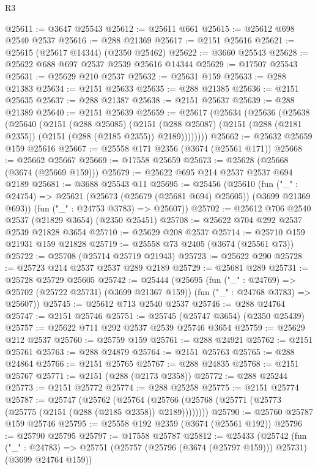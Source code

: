 \begin{lexlean}{R3}
\begin{coremodule}
@25611 := @3647 @25543
@25612 := @25611 @661
@25615 := @25612 @698 @2540 @2537
@25616 := @288 @21369
@25617 := @2151 @25616
@25621 := @25615 (@25617 @14344) (@2350 @25462)
@25622 := @3660 @25543
@25628 := @25622 @688 @697 @2537 @2539 @25616 @14344
@25629 := @17507 @25543
@25631 := @25629 @210 @2537
@25632 := @25631 @159
@25633 := @288 @21383
@25634 := @2151 @25633
@25635 := @288 @21385
@25636 := @2151 @25635
@25637 := @288 @21387
@25638 := @2151 @25637
@25639 := @288 @21389
@25640 := @2151 @25639
@25659 := @25617
    (@25634
      (@25636
        (@25638
          (@25640
            (@2151
              (@288 @25085)
              (@2151
                (@288 @25087)
                (@2151 (@288 (@2181 @2355)) (@2151 (@288 (@2185 @2355)) @2189))))))))
@25662 := @25632 @25659 @159 @25616
@25667 := @25558 @171 @2356 (@3674 (@25561 @171))
@25668 := @25662 @25667
@25669 := @17558 @25659
@25673 := @25628 (@25668 (@3674 (@25669 @159)))
@25679 := @25622 @695 @214 @2537 @2537 @694 @2189
@25681 := @3688 @25543 @11
@25695 := @25456
    (@25610
      (fun ("_" : @24754) => @25621 (@25673 (@25679 (@25681 @694) @25605)) (@3699 @21369 @693))
      (fun ("_" : @24753 @3783) => @25607))
@25702 := @25612 @706 @2540 @2537 (@21829 @3654) (@2350 @25451)
@25708 := @25622 @704 @292 @2537 @2539 @21828 @3654
@25710 := @25629 @208 @2537
@25714 := @25710 @159 @21931 @159 @21828
@25719 := @25558 @73 @2405 (@3674 (@25561 @73))
@25722 := @25708 (@25714 @25719 @21943)
@25723 := @25622 @290
@25728 := @25723 @214 @2537 @2537 @289 @2189
@25729 := @25681 @289
@25731 := @25728 @25729 @25605
@25742 := @25444
    (@25695
      (fun ("_" : @24769) => @25702 (@25722 @25731) (@3699 @21367 @159))
      (fun ("_" : @24768 @3783) => @25607))
@25745 := @25612 @713 @2540 @2537
@25746 := @288 @24764
@25747 := @2151 @25746
@25751 := @25745 (@25747 @3654) (@2350 @25439)
@25757 := @25622 @711 @292 @2537 @2539 @25746 @3654
@25759 := @25629 @212 @2537
@25760 := @25759 @159
@25761 := @288 @24921
@25762 := @2151 @25761
@25763 := @288 @24879
@25764 := @2151 @25763
@25765 := @288 @24864
@25766 := @2151 @25765
@25767 := @288 @24835
@25768 := @2151 @25767
@25771 := @2151 (@288 (@2173 @2358))
@25772 := @288 @25244
@25773 := @2151 @25772
@25774 := @288 @25258
@25775 := @2151 @25774
@25787 := @25747
    (@25762
      (@25764 (@25766 (@25768 (@25771 (@25773 (@25775 (@2151 (@288 (@2185 @2358)) @2189))))))))
@25790 := @25760 @25787 @159 @25746
@25795 := @25558 @192 @2359 (@3674 (@25561 @192))
@25796 := @25790 @25795
@25797 := @17558 @25787
@25812 := @25433
    (@25742
      (fun ("_" : @24783) =>
      @25751 (@25757 (@25796 (@3674 (@25797 @159))) @25731) (@3699 @24764 @159))

\end{coremodule}
\end{lexlean}
